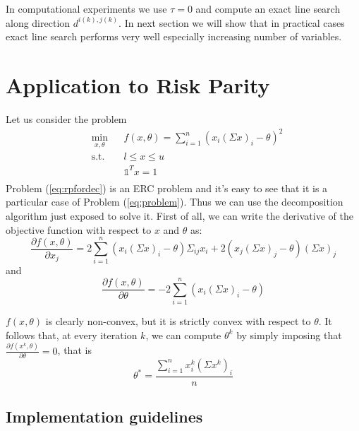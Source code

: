 \begin{oss}
In computational experiments we use $\tau = 0$ and compute an exact line search along direction $d^{i(k),j(k)}$. In next section we will show that in practical cases exact line search performs very well especially increasing number of variables.
\end{oss}

\section{Application to Risk Parity}
Let us consider the problem
\begin{equation}\label{eq:rpfordec}
\begin{aligned}
& \underset{x, \theta}{\text{min}}
&&f(x,\theta)=\sum_{i=1}^n \left(x_i (\Sigma x)_i - \theta\right)^2\\
& \text{s.t.}
&& l \leq x \leq u\\
&&& \mathds{1}^T x = 1 \\
\end{aligned}
\end{equation}
Problem (\ref{eq:rpfordec}) is an ERC problem and it's easy to see that it is a particular case of Problem (\ref{eq:problem}). Thus we can use the decomposition algorithm just exposed to solve it. First of all, we can write the derivative of the objective function with respect to $x$ and $\theta$ as:
\begin{equation}\label{eq:gradxdec}
\frac{\partial f(x,\theta)}{\partial x_j} = 2 \sum_{i=1}^n \left(x_i (\Sigma x)_i - \theta\right)\Sigma_{ij}x_i + 2(x_j (\Sigma x)_j - \theta)(\Sigma x)_j
\end{equation}
and
\begin{equation}\label{eq:gradthetadec}
\frac{\partial f(x,\theta)}{\partial \theta}= -2\sum_{i=1}^n \left(x_i (\Sigma x)_i - \theta\right)
\end{equation}

$f(x,\theta)$ is clearly non-convex, but it is strictly convex with respect to $\theta$. It follows that, at every iteration $k$, we can compute $\theta^{k}$ by simply imposing that $\frac{\partial f(x^{k},\theta)}{\partial \theta} =0$, that is
\begin{equation}\label{eq:theta}
\theta^* = \frac{\sum_{i=1}^n x_i^{k} (\Sigma x^{k})_i}{n}
\end{equation} 

\subsection{Implementation guidelines}
